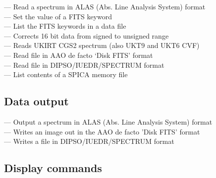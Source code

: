  --- Read a spectrum in ALAS (Abs. Line Analysis System) format\\
 --- Set the value of a FITS keyword\\
 --- List the FITS keywords in a data file\\
 --- Corrects 16 bit data from signed to unsigned range\\
 --- Reads UKIRT CGS2 spectrum (also UKT9 and UKT6 CVF)\\
 --- Read file in AAO de facto `Disk FITS' format\\
 --- Read file in DIPSO/IUEDR/SPECTRUM format\\
 --- List contents of a SPICA memory file


\subsection{\label{classifoutput}Data output}

 --- Output a spectrum in ALAS (Abs. Line Analysis System) format\\
 --- Writes an image out in the AAO de facto 'Disk FITS' format\\
 --- Writes a file in DIPSO/IUEDR/SPECTRUM format


\subsection{\label{classifdisplay}Display commands}

